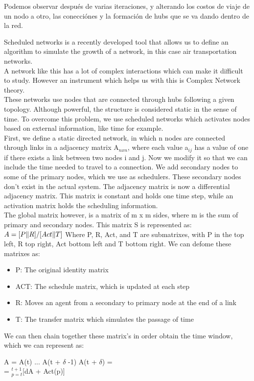 \documentclass[a4paper, 11pt]{report}
\begin{document}
Podemos observar después de varias iteraciones, y alterando los costos de viaje
de un nodo a otro, las conecciónes y la formación de hubs que se va dando dentro
de la red.

Scheduled networks is a recently developed tool that allows us to
define an algorithm to simulate the growth of a network, in this case
air transportation networks. \\

A network like this has a lot of complex interactions which can make
it difficult to study. However an instrument which helps us with this
is Complex Network theory. \\

These networks use nodes that are connected through hubs following a
given topology. Although powerful, the structure is considered static
in the sense of time. To overcome this problem, we use scheduled
networks which activates nodes based on external information, like
time for example. \\

First, we define a static directed network, in which n nodes are
connected through links in a adjacency matrix A$_{nxn}$, where each
value a$_{ij}$ has a value of one if there exists a link between two
nodes i and j. Now we modify it so that we can include the time
needed to travel to a connection. We add secondary nodes to some of
the primary nodes, which we use as schedulers. These secondary nodes
don't exist in the actual system. The adjacency matrix is now a
differential adjacency matrix. This matrix is constant and holds one
time step, while an activation matrix holds the scheduling
information. \\

The global matrix however, is a matrix of m x m sides, where m is
the sum of primary and secondary nodes. This matrix S is represented
as:\\
$A = [ P \| R ] / [Act \| T]\\$
Where P, R, Act, and T are submatrixes, with P in the top left, R top
right, Act bottom left and T bottom right. We can defome these matrixes as:
\begin{itemize}
    \item P: The original identity matrix
    \item ACT: The schedule matrix, which is updated at each step
    \item R: Moves an agent from a secondary to primary node at the end of a link
    \item T: The transfer matrix which simulates the passage of time
\end{itemize}
We can then chain together these matrix's in order obtain the time
window, which we can represent as:
\begin{center}
    A = A(t) ... A(t + $\delta$ -1) A(t + $\delta$) = \\
    = \prod$^{t+1}_{p=t}$[dA + Act(p)]
\end{center}
\end{document}
